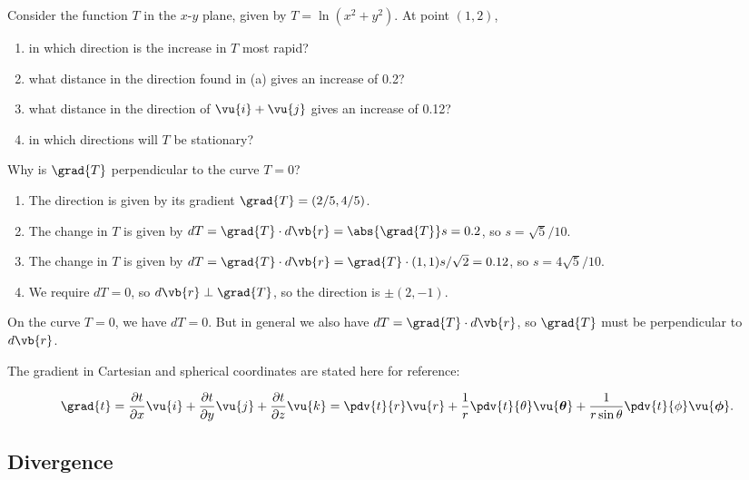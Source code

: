 \documentclass[english,a4paper,12pt]{report}
\begin{document}
{Consider the function \(T\) in the \(x\)-\(y\) plane, given by \(T = \ln (x^2+y^2)\). At point \((1,2)\),

\begin{enumerate}
	\item in which direction is the increase in \(T\) most rapid?
	\item what distance in the direction found in (a) gives an increase of 0.2?
	\item what distance in the direction of \(\vu{i} + \vu{j} \) gives an increase of 0.12?
	\item in which directions will \(T\) be stationary? 
\end{enumerate}

Why is \(\grad{T} \) perpendicular to the curve \(T = 0\)?  
}
{\begin{enumerate}
	\item The direction is given by its gradient \(\grad{T} = (2/ 5, 4 /5) \).
	\item The change in \(T\) is given by \(dT = \grad{T} \cdot d\vb{r} = \abs{\grad{T} }s = 0.2 \), so \(s = \sqrt{5} /10 \).  
	\item The change in \(T\) is given by \(dT = \grad{T} \cdot d\vb{r} =  \grad{T} \cdot (1,1) s /\sqrt{2} = 0.12\), so \(s = 4 \sqrt{5}/ 10 \).  
	\item We require \(dT = 0\), so \(d \vb{r} \perp \grad{T} \), so the direction is \(\pm (2,-1)\).   
\end{enumerate}

On the curve \(T = 0\), we have \(dT = 0\). But in general we also have \(dT = \grad{T} \cdot d\vb{r}  \), so \(\grad{T} \) must be perpendicular to \(d\vb{r} \).     
} 



The gradient in Cartesian and spherical coordinates are stated here for reference:

\begin{equation} 
	\grad{t} = \frac{\partial t}{\partial x} \vu{i} + \frac{\partial t}{\partial y} \vu{j} + \frac{\partial t}{\partial z} \vu{k} = \pdv{t}{r}\vu{r} + \frac{1}{r}\pdv{t}{\theta}\vu{\boldsymbol{\theta } } + \frac{1}{r\sin{\theta}}\pdv{t}{\phi}\vu{\boldsymbol{\phi } }. 
\end{equation}
	
\subsection{Divergence}
\end{document}
